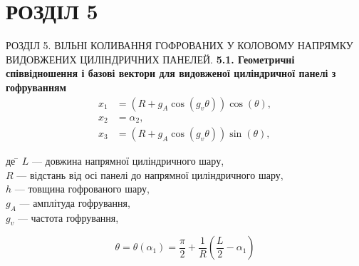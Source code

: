 \documentclass[8pt]{beamer}
\numberwithin{figure}{section}
\numberwithin{equation}{section}
\numberwithin{table}{section}
\begin{document}
\section{РОЗДІЛ 5}

\begin{frame}{РОЗДІЛ 5. ВІЛЬНІ КОЛИВАННЯ ГОФРОВАНИХ У КОЛОВОМУ НАПРЯМКУ ВИДОВЖЕНИХ ЦИЛІНДРИЧНИХ ПАНЕЛЕЙ.}
\textbf{5.1. Геометричні співвідношення і базові вектори для видовженої циліндричної панелі з гофруванням}
\\
\vspace{1em}
\begin{equation}
\begin{aligned}
x_1&=\left(R + g_{A}\cos\left(g_v\theta\right) \right)\cos\left(\theta\right), \\
x_2&=\alpha_2,\\
x_3&=\left(R + g_{A}\cos\left(g_v\theta\right) \right)\sin\left(\theta\right), 
\end{aligned}
\end{equation}

\begin{tabbing}
де \= $L$ --- довжина напрямної циліндричного шару,\\
\> $R$ --- відстань від осі панелі до напрямної циліндричного шару,\\
\> $h$ --- товщина гофрованого шару,\\
\> $g_A$ --- амплітуда гофрування,\\
\> $g_v$ --- частота гофрування,\\
\end{tabbing}
\[
\theta=\theta\left(\alpha_1\right)=\frac{\pi}{2}+\frac{1}{R}\left(\frac{L}{2}-\alpha_1\right)\]


\end{frame}
\end{document}
